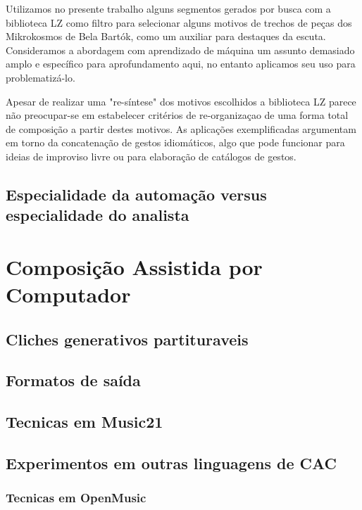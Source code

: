 \documentclass[
	12pt,				%
	openright,			%
	twoside,			%
	a4paper,			%
	english,			%
	french,				%
	spanish,			%
	brazil				%
	]{abntex2}
\begin{document}
Utilizamos no presente trabalho alguns segmentos gerados por busca com a biblioteca LZ como filtro para selecionar alguns motivos de trechos de peças dos Mikrokosmos de Bela Bartók, como um auxiliar para destaques da escuta. Consideramos a abordagem com aprendizado de máquina um assunto demasiado amplo e específico para aprofundamento aqui, no entanto aplicamos seu uso para problematizá-lo.

Apesar de realizar uma "re-síntese" dos motivos escolhidos a biblioteca LZ parece não preocupar-se em estabelecer critérios de re-organizaçao de uma forma total de composição a partir destes motivos. As aplicações exemplificadas argumentam em torno da concatenação de gestos idiomáticos, algo que pode funcionar para ideias de improviso livre ou para elaboração de catálogos de gestos. 




\section{Especialidade da automação versus especialidade do analista}



\chapter{Composição Assistida por Computador}
\label{cac}

\section{Cliches generativos partituraveis}



\section{Formatos de saída}

\section{Tecnicas em Music21}

\section{Experimentos em outras linguagens de CAC}

\subsection{Tecnicas em OpenMusic}
\end{document}
